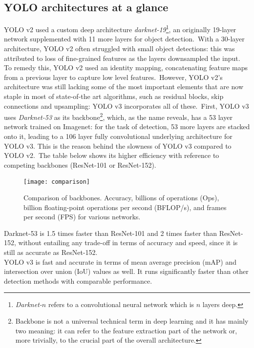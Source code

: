 \documentclass[../report.tex]{subfiles}
\begin{document}
\subsection{YOLO architectures at a glance}\label{ss:arch-glance}
YOLO v2 used a custom deep architecture \textit{darknet-19}\footnote{\textit{Darknet-$n$} refers to a convolutional neural network which is $n$ layers deep.}, an originally 19-layer network supplemented with 11 more layers for object detection.\
With a 30-layer architecture, YOLO v2 often struggled with small object detections: this was attributed to loss of fine-grained features as the layers downsampled the input. To remedy this, YOLO v2 used an identity mapping, concatenating feature maps from a previous layer to capture low level features.\
However, YOLO v2’s architecture was still lacking some of the most important elements that are now staple in most of state-of-the art algorithms, such as residual blocks, skip connections and upsampling: YOLO v3 incorporates all of these.\
First, YOLO v3 uses \textit{Darknet-53} as its backbone\footnote{Backbone is not a universal technical term in deep learning and it has mainly two meaning: it can refer to the feature extraction part of the network or, more trivially, to the crucial part of the overall architecture.}, which, as the name reveals, has a 53 layer network trained on Imagenet: for the task of detection, 53 more layers are stacked onto it, leading to a 106 layer fully convolutional underlying architecture for YOLO v3. This is the reason behind the slowness of YOLO v3 compared to YOLO v2.\
The table below shows its higher efficiency with reference to competing backbones (ResNet-101 or ResNet-152).

\begin{figure}[H]
	\centering
	\texttt{[image: comparison]}
	\caption{Comparison of backbones. Accuracy, billions of operations (Ops), billion floating-point operations per second (BFLOP/s), and frames per second (FPS) for various networks.} \label{fig:comparison}
\end{figure}
\noindent
Darknet-53 is 1.5 times faster than ResNet-101 and 2 times faster than ResNet-152, without entailing any trade-off in terms of accuracy and speed, since it is still as accurate as ResNet-152.\\
\noindent
YOLO v3 is fast and accurate in terms of mean average precision (mAP) and intersection over union (IoU) values as well. It runs significantly faster than other detection methods with comparable performance.
\end{document}
